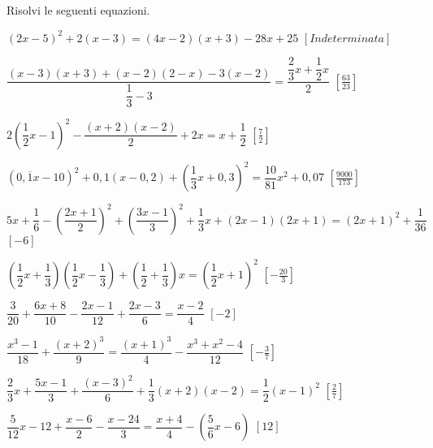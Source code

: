 \begin{esercizio}[\Ast]
\label{ese:13.41}
Risolvi le seguenti equazioni.
\begin{enumeratea}
\spazielenx
 \item $(2x-5)^2 +2(x-3)=(4x-2)(x+3)-28x+25$
  \hfill $\left[Indeterminata\right]$
 \item $\dfrac{(x-3)(x+3)+(x-2)(2-x)-3(x-2)}{\dfrac{1}{3}-3}=
        \dfrac{\dfrac{2}{3}x+\dfrac{1}{2}x}{2}$
  \hfill $\left[\frac{63}{23}\right]$
 \item $2\left(\dfrac{1}{2}x-1\right)^{2}-\dfrac{(x+2)(x-2)}{2}+2x=
        x+\dfrac{1}{2}$
  \hfill $\left[\frac{7}{2}\right]$
 \item $\left(0,\overline{{1}}x-10\right)^{2}+0,1(x-0,2)+
        \left(\dfrac{1}{3}x+0,3\right)^{2}=\dfrac{10}{81}x^{2}+0,07$
  \hfill $\left[\frac{9000}{173}\right]$
 \item $5x+\dfrac{1}{6}-\left(\dfrac{2x+1}{2}\right)^{2}+
        \left(\dfrac{3x-1}{3}\right)^{2}+\dfrac{1}{3}x+(2x-1)(2x+1)=
        (2x+1)^{2}+\dfrac{1}{36}$
  \hfill $\left[-6\right]$
 \item $\left(\dfrac{1}{2}x+\dfrac{1}{3}\right)\left(\dfrac{1}{2}x-
        \dfrac{1}{3}\right)+\left(\dfrac{1}{2}+\dfrac{1}{3}\right)x=
        \left(\dfrac{1}{2}x+1\right)^{2}$
  \hfill $\left[-{\frac{20}{3}}\right]$
 \item $\dfrac{3}{20}+\dfrac{6x+8}{10}-\dfrac{2x-1}{12}+\dfrac{2x-3}{6}=
        \dfrac{x-2}{4}$
  \hfill $\left[-2\right]$
 \item $\dfrac{x^{3}-1}{18}+\dfrac{(x+2)^{3}}{9}=
        \dfrac{(x+1)^{3}}{4}-\dfrac{x^{3}+x^{2}-4}{12}$
  \hfill $\left[-{\frac{3}{7}}\right]$
 \item $\dfrac{2}{3}x+\dfrac{5x-1}{3}+\dfrac{(x-3)^{2}}{6}+
        \dfrac{1}{3}(x+2)(x-2)=\dfrac{1}{2}(x-1)^{2}$
  \hfill $\left[\frac{2}{7}\right]$
 \item $\dfrac{5}{12}x-12+\dfrac{x-6}{2}-\dfrac{x-24}{3}=
        \dfrac{x+4}{4}-\left(\dfrac{5}{6}x-6\right)$
  \hfill $\left[12\right]$

\end{enumeratea}
\end{esercizio}
